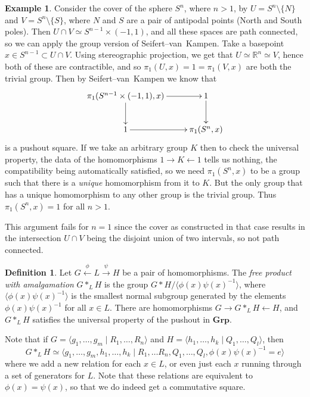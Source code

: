 \documentclass{tufte-handout}
\def\Grp {\mathbf{Grp}}
\def\RR{\mathbb{R}}
\newcommand{\lecturenum}[1]{\marginnote{\color{red}Lecture #1}}
\theoremstyle{definition}
\newtheorem{definition}{Definition}
\newtheorem{example}{Example}
\begin{document}
\begin{example}

Consider the cover of the sphere $S^n$, where $n>1$, by $U=S^n\setminus\{N\}$ and 
$V=S^n\setminus\{S\}$, where $N$ and $S$ are a pair of antipodal points (North and South 
poles). Then $U\cap V \simeq S^{n-1}\times (-1,1)$, and all these spaces are path 
connected, so we can apply the group version of Seifert--van~Kampen. Take a basepoint 
$x\in S^{n-1} \subset U\cap V$. Using stereographic projection, we get that $U\simeq 
\RR^n \simeq V$, hence both of these are contractible, and so $\pi_1(U,x) = 1 = 
\pi_1(V,x)$ are both the trivial group. Then by Seifert--van~Kampen we know that
\[
\xymatrix{
	\pi_1(S^{n-1}\times(-1,1),x) \ar[r] \ar[d] & 1 \ar[d]\\
	1 \ar[r] & \pi_1(S^n,x)
}
\]
is a pushout square. If we take an arbitrary group $K$ then to check the universal 
property, the data of the homomorphisms $1\to K \leftarrow 1$ tells us nothing, the 
compatibility being automatically satisfied, so we need $\pi_1(S^n,x)$ to be a group 
such that there is a \emph{unique} homomorphism from it to $K$. But the only group that 
has a unique homomorphism to any other group is the trivial group. Thus $\pi_1(S^n,x)=1$ 
for all $n>1$.
\end{example}

This argument fails for $n=1$ since the cover as constructed in that case results in the 
intersection $U\cap V$ being the disjoint union of two intervals, so not path connected.

\lecturenum{13}

\begin{definition}

Let $G\xleftarrow{\phi} L \xrightarrow{\psi} H$ be a pair of homomorphisms. The 
\emph{free product with amalgamation} $G\ast_L H$ is the group $G\ast H/\langle 
\phi(x)\psi(x)^{-1}\rangle$, where $\langle \phi(x)\psi(x)^{-1}\rangle$ is the smallest normal 
subgroup generated by the elements $\phi(x)\psi(x)^{-1}$ for all $x\in L$. There are 
homomorphisms $G\to G\ast_L H \leftarrow H$, and $G\ast_L H$ satisfies the universal 
property of the pushout in $\Grp$.

\end{definition}

Note
 that if $G = \langle g_1,\ldots,g_m \mid R_1,\ldots,R_n\rangle$ and $H=\langle 
h_1,\ldots,h_k \mid Q_1,\ldots,Q_l\rangle$, then
\[
	G\ast_L H \simeq \langle g_1,\ldots,g_m,h_1,\ldots,h_k\mid R_1,\ldots R_n,Q_1,\ldots, Q_l,
			\phi(x)\psi(x)^{-1}=e \rangle 
\]
where we add a new relation for each $x\in L$, or even just each $x$ running through a 
set of generators for $L$. Note that these relations are equivalent to $\phi(x) = \psi(x)$,
so that we do indeed get a commutative square.
\end{document}
